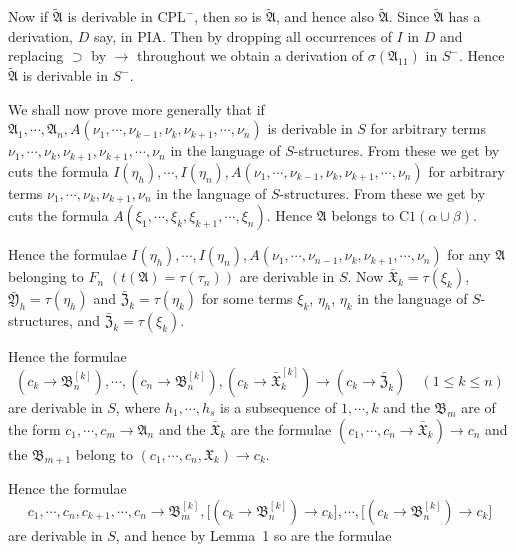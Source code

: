\documentclass[12pt,a4paper]{article}
\begin{document}
Now if $\tilde{\mathfrak{A}}$ is derivable in $\mathrm{CPL}^-$, then so is
$\tilde{\mathfrak{A}}$, and hence also $\tilde{\mathfrak{A}}$. Since
$\tilde{\mathfrak{A}}$ has a derivation, $D$ say, in PIA. Then by dropping
all occurrences of $I$ in $D$ and replacing $\supset$ by $\to$ throughout we
obtain a derivation of $\sigma(\mathfrak{A}_{11})$ in $S^-$. Hence
$\tilde{\mathfrak{A}}$ is derivable in $S^-$.

\bigskip
\noindent
We shall now prove more generally that if
$\mathfrak{A}_1, \cdots, \mathfrak{A}_n, A(\nu_1, \cdots, \nu_{k-1},
\nu_k, \nu_{k+1}, \cdots, \nu_n)$
is derivable in $S$ for arbitrary terms $\nu_1, \cdots, \nu_k, \nu_{k+1},
\nu_{k+1}, \cdots, \nu_n$ in the language of $S$-structures.
From these we get by cuts the formula
$I(\eta_h), \cdots, I(\eta_n), A(\nu_1, \cdots, \nu_{k-1}, \nu_k,
\nu_{k+1}, \cdots, \nu_n)$
for arbitrary terms $\nu_1, \cdots, \nu_k, \nu_{k+1}, \nu_n$ in the language
of $S$-structures.
From these we get by cuts the formula $A(\xi_1, \cdots, \xi_k, \xi_{k+1},
\cdots, \xi_n)$.
Hence $\mathfrak{A}$ belongs to $\mathrm{C1}(\alpha \cup \beta)$.

Hence the formulae $I(\eta_h), \cdots, I(\eta_n), A(\nu_1, \cdots,
\nu_{n-1}, \nu_k, \nu_{k+1}, \cdots, \nu_n)$ for any $\mathfrak{A}$ belonging
to $F_n$ $(t(\mathfrak{A}) = \tau(\tau_n))$ are derivable in $S$. Now
$\bar{\mathfrak{X}}_k = \tau(\xi_k)$, $\bar{\mathfrak{Y}}_h = \tau(\eta_h)$
and $\bar{\mathfrak{Z}}_k = \tau(\eta_k)$ for some terms $\xi_k$, $\eta_h$,
$\eta_k$ in the language of $S$-structures, and $\bar{\mathfrak{Z}}_k =
\tau(\xi_k)$.

\bigskip\noindent
Hence the formulae
\[
(c_k \to \mathfrak{B}_n^{[k]}), \cdots, (c_n \to \mathfrak{B}_n^{[k]}),
(c_k \to \bar{\mathfrak{X}}_k^{[k]}) \to (c_k \to \bar{\mathfrak{Z}}_k)
\quad (1 \le k \le n)
\]
are derivable in $S$, where $h_1, \cdots, h_s$ is a subsequence of
$1, \cdots, k$ and the $\mathfrak{B}_m$ are of the form $c_1, \cdots, c_m
\to \mathfrak{A}_n$ and the $\bar{\mathfrak{X}}_k$ are the formulae
$(c_1, \cdots, c_n \to \bar{\mathfrak{X}}_k) \to c_n$ and the
$\mathfrak{B}_{m+1}$ belong to $(c_1, \cdots, c_n, \mathfrak{X}_k) \to c_k$.

Hence the formulae
\[
c_1, \cdots, c_n, c_{k+1}, \cdots, c_n \to \mathfrak{B}_m^{[k]},
\bigl[(c_k \to \mathfrak{B}_n^{[k]}) \to c_k\bigr],
\cdots,
\bigl[(c_k \to \mathfrak{B}_n^{[k]}) \to c_k\bigr]
\]
are derivable in $S$, and hence by Lemma~1 so are the formulae
\end{document}
